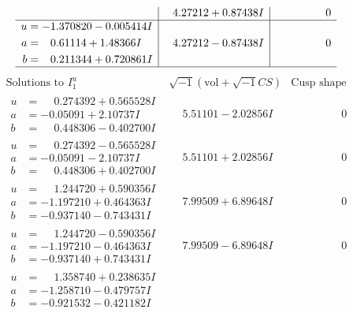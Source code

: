 \documentclass[1p]{elsarticle_modified}
\theoremstyle{definition}
\newcommand{\I}{\sqrt{-1}}
\begin{document}
$$\begin{array}{c|c|c}
 & \phantom{-}4.27212 + 0.87438 I & \phantom{-0.000000 } 0 \\ \hline\begin{aligned}
u &= -1.370820 - 0.005414 I \\
a &= \phantom{-}0.61114 + 1.48366 I \\
b &= \phantom{-}0.211344 + 0.720861 I\end{aligned}
 & \phantom{-}4.27212 - 0.87438 I & \phantom{-0.000000 } 0\\
 \hline 
 \end{array}$$\newpage$$\begin{array}{c|c|c}  
\text{Solutions to }I^u_{1}& \I (\text{vol} + \sqrt{-1}CS) & \text{Cusp shape}\\
 \hline 
\begin{aligned}
u &= \phantom{-}0.274392 + 0.565528 I \\
a &= -0.05091 + 2.10737 I \\
b &= \phantom{-}0.448306 - 0.402700 I\end{aligned}
 & \phantom{-}5.51101 - 2.02856 I & \phantom{-0.000000 } 0 \\ \hline\begin{aligned}
u &= \phantom{-}0.274392 - 0.565528 I \\
a &= -0.05091 - 2.10737 I \\
b &= \phantom{-}0.448306 + 0.402700 I\end{aligned}
 & \phantom{-}5.51101 + 2.02856 I & \phantom{-0.000000 } 0 \\ \hline\begin{aligned}
u &= \phantom{-}1.244720 + 0.590356 I \\
a &= -1.197210 + 0.464363 I \\
b &= -0.937140 - 0.743431 I\end{aligned}
 & \phantom{-}7.99509 + 6.89648 I & \phantom{-0.000000 } 0 \\ \hline\begin{aligned}
u &= \phantom{-}1.244720 - 0.590356 I \\
a &= -1.197210 - 0.464363 I \\
b &= -0.937140 + 0.743431 I\end{aligned}
 & \phantom{-}7.99509 - 6.89648 I & \phantom{-0.000000 } 0 \\ \hline\begin{aligned}
u &= \phantom{-}1.358740 + 0.238635 I \\
a &= -1.258710 - 0.479757 I \\
b &= -0.921532 - 0.421182 I\end{aligned}

\end{array}$$
\end{document}
